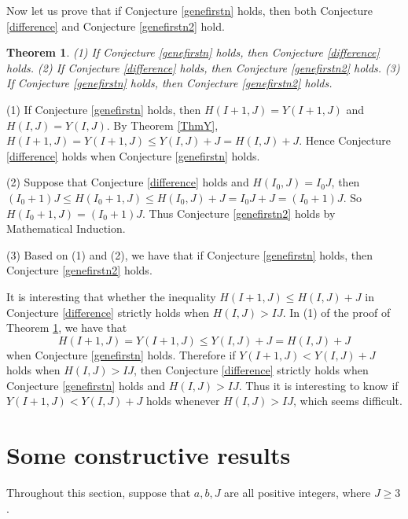 \documentclass[preprint,12pt]{elsarticle}
\newtheorem{thm}{Theorem}
\begin{document}
Now let us prove that if Conjecture \ref{genefirstn} holds,
then both Conjecture \ref{difference} and Conjecture \ref{genefirstn2} hold.
\vspace{0.3cm}

\begin{thm}\label{genefirstn1to2NEW}
(1) If Conjecture \ref{genefirstn} holds, then Conjecture \ref{difference} holds.
(2) If Conjecture \ref{difference} holds, then Conjecture \ref{genefirstn2} holds.
(3) If Conjecture \ref{genefirstn} holds, then Conjecture \ref{genefirstn2} holds.
\end{thm}
\vspace{0.3cm}
\begin{pf}
(1) If Conjecture \ref{genefirstn} holds,
then $H(I+1, J) = Y(I+1, J)$ and $H(I, J) = Y(I, J)$.
By Theorem \ref{ThmY},
$H(I+1, J) = Y(I+1, J) \leq Y(I, J) + J = H(I, J) + J$.
Hence Conjecture \ref{difference} holds when Conjecture \ref{genefirstn} holds.

(2) Suppose that Conjecture \ref{difference} holds and $H(I_0, J) = I_0 J$, then
$(I_0+1)J \leq H(I_0+1, J) \leq H(I_0,J)+J = I_0J+ J = (I_0+1)J$. So $H(I_0+1, J) = (I_0+1)J$.
Thus Conjecture \ref{genefirstn2} holds by Mathematical Induction.

(3) Based on (1) and (2), we have that
if Conjecture \ref{genefirstn} holds, then Conjecture \ref{genefirstn2} holds.
\end{pf}
\vspace{0.3cm}


It is interesting that whether the inequality $H(I+1, J) \leq H(I, J) + J$
in Conjecture \ref{difference} strictly holds when $H(I, J) > IJ$.
In (1) of the proof of Theorem \ref{genefirstn1to2NEW},
we have that
$$H(I+1, J) = Y(I+1, J) \leq Y(I, J) + J = H(I, J) + J$$
when Conjecture \ref{genefirstn} holds.
Therefore if $Y(I+1, J) < Y(I, J) +J$ holds when $H(I, J) > IJ$,
then Conjecture \ref{difference} strictly holds when
Conjecture \ref{genefirstn} holds and
$H(I, J) > IJ$.
Thus it is interesting to know if $Y(I+1, J) < Y(I, J) +J$ holds
whenever $H(I, J) > IJ$, which seems difficult.





\section{Some constructive results}
\label{scr}

Throughout this section, suppose that $a, b, J$ are all positive integers, where $J \geq 3$.
\end{document}
